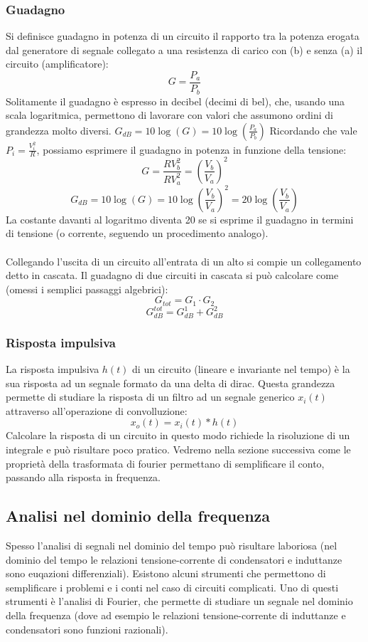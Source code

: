 \documentclass{article}
\begin{document}
\subsubsection{Guadagno}
Si definisce guadagno in potenza di un circuito il rapporto tra la potenza erogata dal generatore di segnale collegato a una resistenza di carico con (b) e senza (a) il circuito (amplificatore):
$$ G = \frac{P_{a}}{P_{b}} $$
Solitamente il guadagno è espresso in decibel (decimi di bel), che, usando una scala logaritmica, permettono di lavorare con valori che assumono ordini di grandezza molto diversi.
$G_{dB}=10\log(G)=10\log(\frac{P_a}{P_b})$
Ricordando che vale $P_i=\frac{V^2_i}{R}$, possiamo esprimere il guadagno in potenza in funzione della tensione:
$$ G = \frac{RV^2_b}{RV_a^2}=\left( \frac{V_b}{V_a} \right)^2 $$
$$ G_{dB} = 10\log(G)=10\log\left(\frac{V_b}{V_a}\right)^2=20\log\left(\frac{V_b}{V_a}\right)  $$
La costante davanti al logaritmo diventa 20 se si esprime il guadagno in termini di tensione (o corrente, seguendo un procedimento analogo).\\\\
Collegando l'uscita di un circuito all'entrata di un alto si compie un collegamento detto in cascata. Il guadagno di due circuiti in cascata si può calcolare come (omessi i semplici passaggi algebrici):
$$ G_{tot} = G_1\cdot G_2 $$
$$ G_{dB}^{tot} = G^1_{dB}+G^2_{dB} $$

\subsubsection{Risposta impulsiva}
La risposta impulsiva $h(t)$ di un circuito (lineare e invariante nel tempo) è la sua risposta ad un segnale formato da una delta di dirac. Questa grandezza permette di studiare la risposta di un filtro ad un segnale generico $x_i(t)$ attraverso all'operazione di convolluzione:
$$ x_o(t) = x_i(t)*h(t) $$
Calcolare la risposta di un circuito in questo modo richiede la risoluzione di un integrale e può risultare poco pratico. Vedremo nella sezione successiva come le proprietà della trasformata di fourier permettano di semplificare il conto, passando alla risposta in frequenza.

\subsection{Analisi nel dominio della frequenza}
Spesso l'analisi di segnali nel dominio del tempo può risultare laboriosa (nel dominio del tempo le relazioni tensione-corrente di condensatori e induttanze sono euqazioni differenziali). Esistono alcuni strumenti che permettono di semplificare i problemi e i conti nel caso di circuiti complicati. Uno di questi strumenti è l'analisi di Fourier, che permette di studiare un segnale nel dominio della frequenza (dove ad esempio le relazioni tensione-corrente di induttanze e condensatori sono funzioni razionali).
\end{document}
